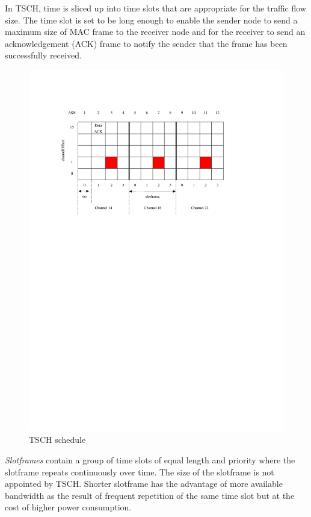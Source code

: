 In TSCH, time is sliced up into time slots that are appropriate for the traffic flow size. The time slot is set to be long enough to enable the sender node to send a maximum size of MAC frame to the receiver node and for the receiver to send an acknowledgement (ACK) frame to notify the sender that the frame has been successfully received.

\begin{figure}
\centering
\includegraphics[trim=2cm 17cm 4cm 3cm, clip=true, totalheight=0.40\textheight]{tsch.pdf}
\caption{TSCH schedule}
\label{fig_tsch}
\end{figure}

\textit{Slotframes} contain a group of time slots of equal length and priority where the slotframe repeats continuously over time. The size of the slotframe is not appointed by TSCH. Shorter slotframe has the advantage of more available bandwidth as the result of frequent repetition of the same time slot but at the cost of higher power consumption. 


